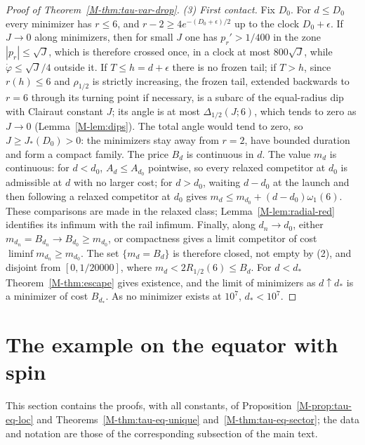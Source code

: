 \documentclass[aip,jmp,amsmath,amssymb,reprint]{revtex4-2}
\theoremstyle{plain}
\theoremstyle{definition}
\begin{document}
\begin{proof}[Proof of Theorem~\ref{M-thm:tau-var-drop}]
\emph{(3) First contact.} Fix $D_0$. For $d\le D_0$ every minimizer has $r\le6$, and
$r-2\ge4e^{-(D_0+\epsilon)/2}$ up to the clock $D_0+\epsilon$. If $J\to0$ along minimizers, then for small $J$ one has $p_r'>1/400$ in the
zone $|p_r|\le\sqrt J$, which is therefore crossed once, in a clock at most $800\sqrt J$, while
$\dot\varphi\le\sqrt J/4$ outside it. If $T\le h=d+\epsilon$ there is no frozen tail; if $T>h$, since $r(h)\le6$ and $\rho_{1/2}$ is strictly increasing, the frozen tail,
extended backwards to $r=6$ through its turning point if necessary, is a subarc of the equal-radius dip
with Clairaut constant $J$; its angle is at most $\Delta_{1/2}(J;6)$, which tends to zero as $J\to0$
(Lemma~\ref{M-lem:dips}). The total angle would tend to zero, so $J\ge J_*(D_0)>0$: the
minimizers stay away from $r=2$, have bounded duration and form a compact family. The price $B_d$
is continuous in $d$. The value $m_d$ is continuous: for $d<d_0$, $A_d\le A_{d_0}$ pointwise, so every
relaxed competitor at $d_0$ is admissible at $d$ with no larger cost; for $d>d_0$, waiting $d-d_0$ at the
launch and then following a relaxed competitor at $d_0$ gives $m_d\le m_{d_0}+(d-d_0)\omega_1(6)$. These
comparisons are made in the relaxed class; Lemma~\ref{M-lem:radial-red} identifies its infimum with the rail
infimum. Finally, along $d_n\to d_0$,
either $m_{d_n}=B_{d_n}\to B_{d_0}\ge m_{d_0}$, or compactness gives a limit competitor of cost
$\liminf m_{d_n}\ge m_{d_0}$. The set $\{m_d=B_d\}$ is therefore closed, not empty by (2), and disjoint from
$[0,1/20000]$, where $m_d<2R_{1/2}(6)\le B_d$. For $d<d_*$ Theorem~\ref{M-thm:escape} gives existence, and
the limit of minimizers as $d\uparrow d_*$ is a minimizer of cost $B_{d_*}$. As no minimizer exists at
$10^7$, $d_*<10^7$.
\end{proof}

\section{The example on the equator with spin}
\label{sec:supp-tk-example}
This section contains the proofs, with all constants, of Proposition~\ref{M-prop:tau-eq-loc} and
Theorems~\ref{M-thm:tau-eq-unique} and~\ref{M-thm:tau-eq-sector}; the data and notation are those of the
corresponding subsection of the main text.
\end{document}
